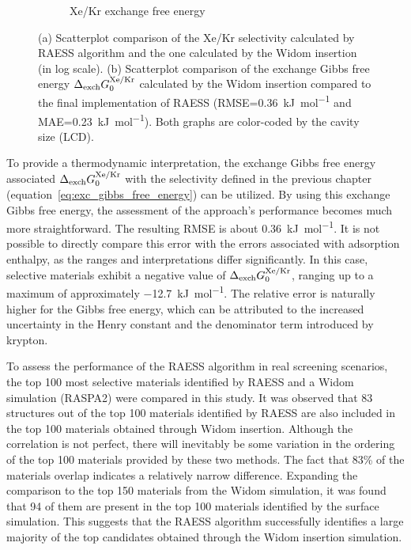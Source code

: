\documentclass[main]{subfiles}
\begin{document}
\begin{figure}[ht]
\begin{subfigure}[b]{0.48\textwidth}
    \caption{Xe/Kr exchange free energy}\label{fgr:exch_free_energy}
  \end{subfigure}
  \caption{ (a) Scatterplot comparison of the Xe/Kr selectivity calculated by RAESS algorithm and the one calculated by the Widom insertion (in log scale). (b) Scatterplot comparison of the exchange Gibbs free energy $\Delta_{\text{exch}}G_{\text{0}}^{\text{Xe/Kr}}$ calculated by the Widom insertion compared to the final implementation of RAESS (RMSE=\SI{0.36}{\kilo\joule\per\mole} and MAE=\SI{0.23}{\kilo\joule\per\mole}). Both graphs are color-coded by the cavity size (LCD). }
\end{figure}

To provide a thermodynamic interpretation, the exchange Gibbs free energy associated $\Delta_{\text{exch}}G_{\text{0}}^{\text{Xe/Kr}}$ with the selectivity defined in the previous chapter (equation~\ref{eq:exc_gibbs_free_energy}) can be utilized. By using this exchange Gibbs free energy, the assessment of the approach's performance becomes much more straightforward. The resulting RMSE is about \SI{0.36}{\kilo\joule\per\mole}. It is not possible to directly compare this error with the errors associated with adsorption enthalpy, as the ranges and interpretations differ significantly. In this case, selective materials exhibit a negative value of $\Delta_{\text{exch}}G_{\text{0}}^{\text{Xe/Kr}}$, ranging up to a maximum of approximately \SI{-12.7}{\kilo\joule\per\mole}. The relative error is naturally higher for the Gibbs free energy, which can be attributed to the increased uncertainty in the Henry constant and the denominator term introduced by krypton.

To assess the performance of the RAESS algorithm in real screening scenarios, the top 100 most selective materials identified by RAESS and a Widom simulation (RASPA2) were compared in this study.  It was observed that 83 structures out of the top 100 materials identified by RAESS are also included in the top 100 materials obtained through Widom insertion. Although the correlation is not perfect, there will inevitably be some variation in the ordering of the top 100 materials provided by these two methods. The fact that {83\%} of the materials overlap indicates a relatively narrow difference. Expanding the comparison to the top 150 materials from the Widom simulation, it was found that 94 of them are present in the top 100 materials identified by the surface simulation. This suggests that the RAESS algorithm successfully identifies a large majority of the top candidates obtained through the Widom insertion simulation.
\end{document}
